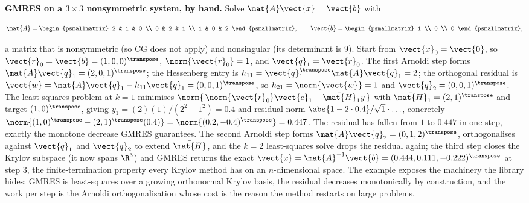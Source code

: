 \begin{example}
\textbf{GMRES on a $3 \times 3$ nonsymmetric system, by hand.} Solve
$\mat{A}\vect{x} = \vect{b}$ with

\[
\mat{A} = \begin{psmallmatrix} 2 & 1 & 0 \\ 0 & 2 & 1 \\ 1 & 0 & 2
\end{psmallmatrix}, \qquad
\vect{b} = \begin{psmallmatrix} 1 \\ 0 \\ 0 \end{psmallmatrix},
\]

a matrix that is nonsymmetric (so CG does not apply) and nonsingular (its
determinant is $9$). Start from $\vect{x}_{0} = \vect{0}$, so $\vect{r}_{0}
= \vect{b} = (1, 0, 0)^{\transpose}$, $\norm{\vect{r}_{0}} = 1$, and
$\vect{q}_{1} = \vect{r}_{0}$. The first Arnoldi step forms $\mat{A}
\vect{q}_{1} = (2, 0, 1)^{\transpose}$; the Hessenberg entry is $h_{11} =
\vect{q}_{1}^{\transpose}\mat{A}\vect{q}_{1} = 2$; the orthogonal residual
is $\vect{w} = \mat{A}\vect{q}_{1} - h_{11}\vect{q}_{1} = (0, 0,
1)^{\transpose}$, so $h_{21} = \norm{\vect{w}} = 1$ and $\vect{q}_{2} =
(0, 0, 1)^{\transpose}$. The least-squares problem at $k = 1$ minimises
$\norm{\,\norm{\vect{r}_{0}}\vect{e}_{1} - \bar{\mat{H}}_{1} y\,}$ with
$\bar{\mat{H}}_{1} = (2, 1)^{\transpose}$ and target $(1, 0)^{\transpose}$,
giving $y_{1} = (2)(1)/(2^{2} + 1^{2}) = 0.4$ and residual norm
$\abs{1 - 2 \cdot 0.4} / \sqrt{1} \cdot \ldots$, concretely
$\norm{(1, 0)^{\transpose} - (2, 1)^{\transpose}(0.4)} = \norm{(0.2,
-0.4)^{\transpose}} = 0.447$. The residual has fallen from $1$ to $0.447$
in one step, exactly the monotone decrease GMRES guarantees. The second
Arnoldi step forms $\mat{A}\vect{q}_{2} = (0, 1, 2)^{\transpose}$,
orthogonalises against $\vect{q}_{1}$ and $\vect{q}_{2}$ to extend
$\bar{\mat{H}}$, and the $k = 2$ least-squares solve drops the residual
again; the third step closes the Krylov subspace (it now spans $\R^{3}$)
and GMRES returns the exact $\vect{x} = \mat{A}^{-1}\vect{b} =
(0.444, 0.111, -0.222)^{\transpose}$ at step $3$, the finite-termination
property every Krylov method has on an $n$-dimensional space. The example
exposes the machinery the library hides: GMRES is least-squares over a
growing orthonormal Krylov basis, the residual decreases monotonically by
construction, and the work per step is the Arnoldi orthogonalisation whose
cost is the reason the method restarts on large problems.
\end{example}

